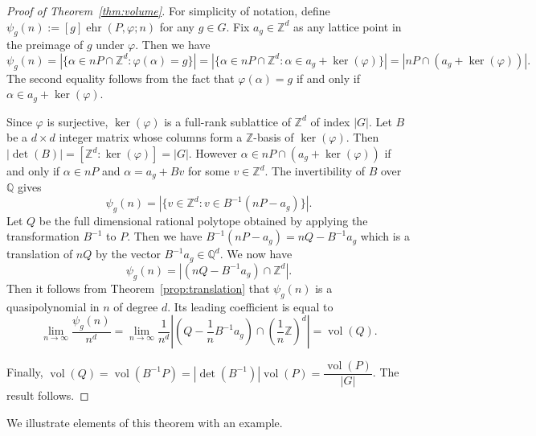 \documentclass[12pt,reqno]{amsart}
\theoremstyle{definition}
\theoremstyle{remark}
\DeclareMathOperator{\vol}{vol}
\newcommand{\Q}{\mathbb{Q}}
\newcommand{\Z}{\mathbb{Z}}
\renewcommand{\phi}{\varphi}
\DeclareMathOperator{\ehr}{ehr}
\begin{document}
\begin{proof}[Proof of Theorem~\ref{thm:volume}]
For simplicity of notation, define $\psi_g(n):=[g]\ehr(P,\phi;n)$ for any $g \in G$.  Fix $a_g \in \Z^d$ as any lattice point in the preimage of $g$ under $\phi$. Then we have
\[
\psi_g(n) =|\{\alpha \in nP \cap \Z^d \colon \phi(\alpha)=g\}|= |\{\alpha \in nP \cap \mathbb{Z}^d \colon \alpha \in a_g + \ker(\varphi)\}| = |nP \cap (a_g+\ker(\varphi))|.
\]
The second equality follows from the fact that $\phi(\alpha)=g$ if and only if $\alpha \in a_g+\ker(\varphi)$.

Since $\phi$ is surjective, $\ker(\phi)$ is a full-rank sublattice of $\Z^d$ of index $|G|$. Let $B$ be a $d \times d$ integer matrix whose columns form a $\Z$-basis of $\ker(\phi)$. Then $|\det(B)|=[\Z^d:\ker(\phi)]=|G|$. 
However $\alpha \in nP \cap (a_g+\ker(\phi))$ if and only if $\alpha \in nP$ and $\alpha=a_g+Bv$ for some $v \in \Z^d$. 
The invertibility of $B$ over $\Q$  gives 
\[
\psi_g(n) = |\{v \in \Z^d \colon v \in B^{-1}(nP-a_g)\}|.
\]
Let $Q$ be the full dimensional rational polytope obtained by applying the transformation $B^{-1}$ to $P$. Then we have $B^{-1}(nP-a_g)=nQ-B^{-1}a_g$ which is a translation of $nQ$ by the vector $B^{-1}a_g \in \mathbb{Q}^d$. We now have
\[
\psi_g(n)=|(nQ-B^{-1}a_g) \cap \mathbb{Z}^d|.
\]
Then it follows from Theorem~\ref{prop:translation} that $\psi_g(n)$ is a quasipolynomial in $n$ of degree $d$. Its leading coefficient is equal to 
\[
\lim_{n\rightarrow \infty} \frac{\psi_g(n)}{n^d} = \lim_{n\rightarrow \infty} \frac{1}{n^d} \left| \left(Q-\frac{1}{n}B^{-1}a_g\right) \cap \left(\frac{1}{n}\Z\right)^d\right| = \vol(Q).
\]



Finally, $\vol(Q)=\vol(B^{-1}P)=|\det(B^{-1})|\vol(P)=\dfrac{\vol(P)}{|G|}$. The result follows.
\end{proof}


We illustrate elements of this theorem with an example. 
\end{document}

